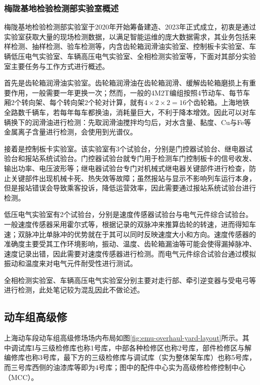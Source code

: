 \subsubsection{梅陇基地检验检测部实验室概述}
梅陇基地检验检测部实验室于2020年开始筹备建造、2023年正式成立，初衷是通过实验室获取大量的现场检测数据，以满足智能运维的庞大数据需求，其业务包括来样检测、抽样检测、验车检测等，内含齿轮箱润滑油实验室、控制板卡实验室、车辆低压电气实验室、车辆高压电气实验室、全相检测实验室等，下面对其部分实验室主要任务与工作方式进行概述。\par{}
首先是齿轮箱润滑油实验室。齿轮箱润滑油在齿轮箱润滑、缓解齿轮箱磨损上有重要作用，一般需要一年更换一次；然而，一般的4M2T编组按照4节动车、每节车厢2个转向架、每个转向架2个轮对计算，就有$4 \times 2 \times 2 = 16$个齿轮箱。上海地铁全路数千辆车，若每年每车都换油，消耗量巨大，不利于降本增效。因此可以对车辆换下的润滑油进行检测：先取润滑油搅拌均匀后，对水含量、黏度、Cu与Fe等金属离子含量进行检测，会使用到光谱仪。\par{}
接着是控制板卡实验室。该实验室有3个试验台，分别是门控器试验台、继电器试验台和报站系统试验台。门控器试验台就专门用于检测车门控制板卡的信号收发、输出功率、电压波形等；继电器试验台专门对机械式继电器关键部件进行检查，防止关键部件出现机械卡死、热失效等故障；虽然报站与显示不影响列车运行本身，但是报站错误会导致乘客投诉，降低运营效率，因此需要通过报站系统试验台进行检测。\par{}
低压电气实验室有2个试验台，分别是速度传感器试验台与电气元件综合试验台。一般速度传感器采用霍尔式等，根据记录的双脉冲来推算齿轮的转速，进而得知车速；双脉冲比单脉冲的优势就在于其可以同时反映速度大小和方向。速度传感器的准确度主要受其工作环境影响，振动、温度、齿轮箱漏油等可能会使得漏掉脉冲、速度记录出错，因此需要对速度传感器进行检测。而电气元件综合试验台通过模拟振动和温度来对电气元件耐受性进行测试。\par{}
全相检测实验室、车辆高压电气实验室分别主要对走行部、牵引逆变器与受电弓等进行检测，此处笔记较为混乱因此不做论述。\par{}

\subsection{动车组高级修}
上海动车段动车组高级修场场内布局如图\ref{fig:emu-overhaul-yard-layout}所示。其中调试库I与三级检修库也称1号库，中部各种检修区也称2号库，部件检修区与解编修库也称3号库，最下方的三级检修库与调试库（实为整体架车库）也称5号库，而三号库西侧的油漆库等即为4号库；图中的配件中心实为高级修检修控制中心（MCC）。\par{}

